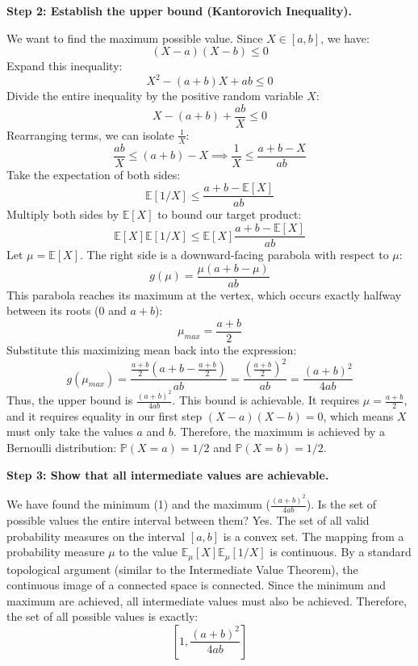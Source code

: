 \begin{solution}
\textbf{Step 2: Establish the upper bound (Kantorovich Inequality).}

We want to find the maximum possible value. Since $X \in [a,b]$, we have:
\[ (X - a)(X - b) \leq 0 \]
Expand this inequality:
\[ X^2 - (a+b)X + ab \leq 0 \]
Divide the entire inequality by the positive random variable $X$:
\[ X - (a+b) + \frac{ab}{X} \leq 0 \]
Rearranging terms, we can isolate $\frac{1}{X}$:
\[ \frac{ab}{X} \leq (a+b) - X \implies \frac{1}{X} \leq \frac{a+b - X}{ab} \]
Take the expectation of both sides:
\[ \mathbb{E}[1/X] \leq \frac{a+b - \mathbb{E}[X]}{ab} \]
Multiply both sides by $\mathbb{E}[X]$ to bound our target product:
\[ \mathbb{E}[X]\mathbb{E}[1/X] \leq \mathbb{E}[X] \frac{a+b - \mathbb{E}[X]}{ab} \]
Let $\mu = \mathbb{E}[X]$. The right side is a downward-facing parabola with respect to $\mu$:
\[ g(\mu) = \frac{\mu(a+b - \mu)}{ab} \]
This parabola reaches its maximum at the vertex, which occurs exactly halfway between its roots (0 and $a+b$):
\[ \mu_{max} = \frac{a+b}{2} \]
Substitute this maximizing mean back into the expression:
\[ g(\mu_{max}) = \frac{\frac{a+b}{2} \left(a+b - \frac{a+b}{2}\right)}{ab} = \frac{\left(\frac{a+b}{2}\right)^2}{ab} = \frac{(a+b)^2}{4ab} \]
Thus, the upper bound is $\frac{(a+b)^2}{4ab}$.
This bound is achievable. It requires $\mu = \frac{a+b}{2}$, and it requires equality in our first step $(X-a)(X-b)=0$, which means $X$ must only take the values $a$ and $b$. Therefore, the maximum is achieved by a Bernoulli distribution: $\mathbb{P}(X=a) = 1/2$ and $\mathbb{P}(X=b) = 1/2$.

\textbf{Step 3: Show that all intermediate values are achievable.}

We have found the minimum (1) and the maximum ($\frac{(a+b)^2}{4ab}$). Is the set of possible values the entire interval between them?
Yes. The set of all valid probability measures on the interval $[a,b]$ is a convex set.
The mapping from a probability measure $\mu$ to the value $\mathbb{E}_\mu[X]\mathbb{E}_\mu[1/X]$ is continuous.
By a standard topological argument (similar to the Intermediate Value Theorem), the continuous image of a connected space is connected. Since the minimum and maximum are achieved, all intermediate values must also be achieved.
Therefore, the set of all possible values is exactly:
\[ \left[ 1, \frac{(a+b)^2}{4ab} \right] \]
\end{solution}


